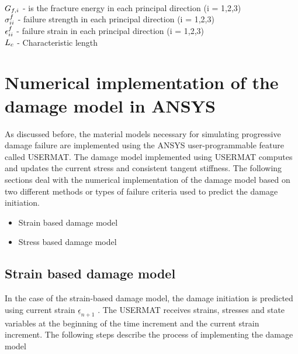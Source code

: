 \documentclass[12pt,a4paper,twoside,openright]{report}
\begin{document}
\\ 
\\ 
\\
$\mathlarger{G_{f,i}}$ \; - \;is the fracture energy in each principal direction (i = 1,2,3)  \\ $\mathlarger{\sigma_{ii}^{f}}$ \;\;\; -  \;  failure strength in each principal direction (i = 1,2,3) \\ $\mathlarger{\epsilon_{ii}^{f}}$\;\;\;\;\; - \; failure strain in each principal direction (i = 1,2,3) \\ $\mathlarger{L_{c}}$\;\;\;\;\; - \; Characteristic length

\section{Numerical implementation of the damage model in ANSYS}
\indent\indent\indent  As discussed before, the material models necessary for simulating progressive damage failure are implemented using the ANSYS user-programmable feature called USERMAT. The damage model implemented using USERMAT computes and updates the current stress and consistent tangent stiffness. The following sections deal with the numerical implementation of the damage model based on two different methods or types of failure criteria used to predict the damage initiation.
\\
\begin{itemize}
\item Strain based damage model 
\item Stress based damage model 
\end{itemize}
\subsection{Strain based damage model}\label{Strain based damage model}
\indent\indent\indent  In the case of the strain-based damage model, the damage initiation is predicted using current strain $\underline{\epsilon}_{n+1}$ \citep{wang2009three}.   The USERMAT receives strains, stresses and state variables at the beginning of the time increment and the current strain increment. The following steps describe the process of implementing the damage model
\end{document}
